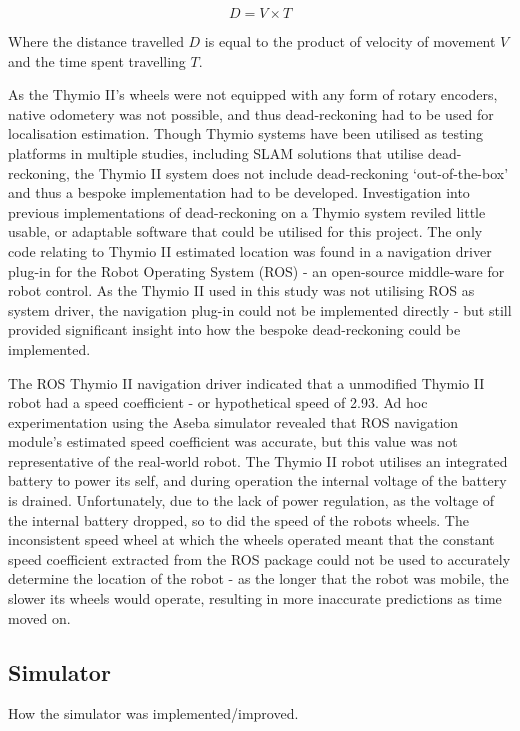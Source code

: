 \[ D = V \times T\]

Where the distance travelled \(D\) is equal to the product of velocity of
movement \(V\) and the time spent travelling \(T\).

As the Thymio II's wheels were not equipped with any form of rotary encoders,
native odometery was not possible, and thus dead-reckoning had to be used for
localisation estimation.
Though Thymio systems have been utilised as testing platforms in multiple
studies, including SLAM solutions that utilise dead-reckoning, the Thymio II
system does not include dead-reckoning `out-of-the-box' and thus a bespoke
implementation had to be developed.
Investigation into previous implementations of dead-reckoning on a Thymio
system reviled little usable, or adaptable software that could be utilised for
this project.
The only code relating to Thymio II estimated location was found in a
navigation driver plug-in for the Robot Operating System (ROS) - an open-source
middle-ware for robot control.
As the Thymio II used in this study was not utilising ROS as system driver,
the navigation plug-in could not be implemented directly - but still provided
significant insight into how the bespoke dead-reckoning could be implemented.

The ROS Thymio II navigation driver indicated that a unmodified Thymio II
robot had a speed coefficient - or hypothetical speed of 2.93.
Ad hoc experimentation using the Aseba simulator revealed that ROS navigation
module's estimated speed coefficient was accurate, but this value was not
representative of the real-world robot.
The Thymio II robot utilises an integrated battery to power its self, and
during operation the internal voltage of the battery is drained.
Unfortunately, due to the lack of power regulation, as the voltage of the
internal battery dropped, so to did the speed of the robots wheels.
The inconsistent speed wheel at which the wheels operated meant that the
constant speed coefficient extracted from the ROS package could not be used to
accurately determine the location of the robot - as the longer that the robot
was mobile, the slower its wheels would operate, resulting in more inaccurate
predictions as time moved on.




\subsection{Simulator}
How the simulator was implemented/improved.
